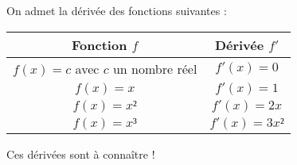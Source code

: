\documentclass[
	classe=$1^{ere}STI2D$,
	headerTitle=Cours\space Chapitre\space 5
]{coursclass}
\begin{document}
\begin{greybox}[frametitle={Dérivée des fonctions de référence}]
	On admet la dérivée des fonctions suivantes :

	\renewcommand{\arraystretch}{1.6}
	\begin{center}
		\begin{tabular}{|c|c|}
			\hline
			Fonction $f$                       & Dérivée $f'$  \\ \hline
			$f(x) = c$ avec $c$ un nombre réel & $f'(x) = 0$   \\ \hline
			$f(x) = x$                         & $f'(x) = 1$   \\ \hline
			$f(x) = x²$                        & $f'(x) = 2x$  \\ \hline
			$f(x) = x³$                        & $f'(x) = 3x²$ \\ \hline
		\end{tabular}
	\end{center}

	Ces dérivées sont à connaître !
\end{greybox}
\end{document}
